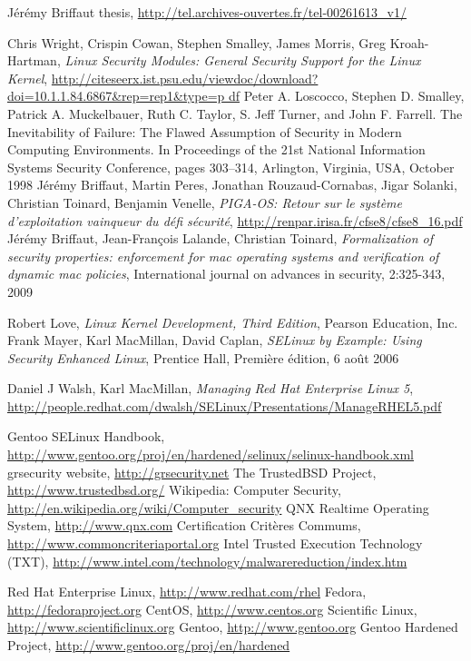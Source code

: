 \documentclass[pdftex,a4paper,titlepage,11pt]{article}
\begin{document}
\begin{thebibliography}{40}

 Jérémy Briffaut thesis,
\url{http://tel.archives-ouvertes.fr/tel-00261613_v1/}

 Chris Wright, Crispin Cowan, Stephen Smalley, James Morris,
Greg Kroah-Hartman, \textit{Linux Security Modules: General Security Support for
the Linux Kernel},
\url{
http://citeseerx.ist.psu.edu/viewdoc/download?doi=10.1.1.84.6867&rep=rep1&type=p
df}
 Peter A. Loscocco, Stephen D. Smalley, Patrick A. Muckelbauer,
Ruth C. Taylor, S. Jeff Turner, and John F. Farrell. The Inevitability of
Failure: The Flawed Assumption of Security in Modern Computing Environments. In
Proceedings of the 21st National Information Systems Security Conference, pages
303–314, Arlington, Virginia, USA, October 1998
 Jérémy Briffaut, Martin Peres, Jonathan
Rouzaud-Cornabas, Jigar Solanki, Christian Toinard, Benjamin Venelle,
\textit{PIGA-OS: Retour sur le système d'exploitation vainqueur du défi
sécurité}, \url{http://renpar.irisa.fr/cfse8/cfse8_16.pdf}
 Jérémy Briffaut, Jean-François Lalande, Christian Toinard,
\textit{Formalization of security properties: enforcement for mac operating
systems and verification of dynamic mac policies}, International journal on
advances in security, 2:325-343, 2009

 Robert Love, \textit{Linux Kernel Development, Third Edition},
Pearson Education, Inc.
 Frank Mayer, Karl MacMillan, David Caplan,
\textit{SELinux by Example: Using Security Enhanced Linux}, Prentice Hall,
Première édition, 6 août 2006

 Daniel J Walsh, Karl MacMillan, \textit{Managing Red Hat
Enterprise Linux 5},
\url{http://people.redhat.com/dwalsh/SELinux/Presentations/ManageRHEL5.pdf}

 Gentoo SELinux Handbook,
\url{http://www.gentoo.org/proj/en/hardened/selinux/selinux-handbook.xml}
 grsecurity website, \url{http://grsecurity.net}
 The TrustedBSD Project, \url{http://www.trustedbsd.org/}
 Wikipedia: Computer Security,
\url{http://en.wikipedia.org/wiki/Computer_security}
 QNX Realtime Operating System, \url{http://www.qnx.com}
 Certification Critères Commums,
\url{http://www.commoncriteriaportal.org}
 Intel Trusted Execution Technology (TXT),
\url{http://www.intel.com/technology/malwarereduction/index.htm}

 Red Hat Enterprise Linux, \url{http://www.redhat.com/rhel}
 Fedora, \url{http://fedoraproject.org}
 CentOS, \url{http://www.centos.org}
 Scientific Linux, \url{http://www.scientificlinux.org}
 Gentoo, \url{http://www.gentoo.org}
 Gentoo Hardened Project,
\url{http://www.gentoo.org/proj/en/hardened}

\end{thebibliography}
\end{document}
